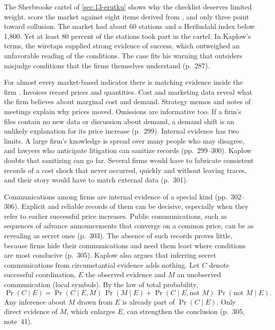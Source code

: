 The Sherbrooke cartel of \cref{sec:13-erutku} shows why the checklist deserves limited weight.
\citet[Table~3]{ErutkuHildebrand2010} score the market against eight items derived from \citet{Stigler1964}, and
only three point toward collusion. The market had about 60 stations and a Herfindahl index below 1,800. Yet at
least 80 percent of the stations took part in the cartel. In Kaplow's terms, the wiretaps supplied strong evidence
of success, which outweighed an unfavorable reading of the conditions. The case fits his warning that outsiders
misjudge conditions that the firms themselves understand (p.~287).

For almost every market-based indicator there is matching evidence inside the firm \citep[pp.~295--302]{Kaplow2013}.
Invoices record prices and quantities. Cost and marketing data reveal what the firm believes about marginal cost
and demand. Strategy memos and notes of meetings explain why prices moved. Omissions are informative too. If a
firm's files contain no new data or discussion about demand, a demand shift is an unlikely explanation for its
price increase (p.~299). Internal evidence has two limits. A large firm's knowledge is spread over many people who
may disagree, and lawyers who anticipate litigation can sanitize records (pp.~299--300). Kaplow doubts that
sanitizing can go far. Several firms would have to fabricate consistent records of a cost shock that never
occurred, quickly and without leaving traces, and their story would have to match external data (p.~301).

Communications among firms are internal evidence of a special kind (pp.~302--306). Explicit and reliable records
of them can be decisive, especially when they refer to earlier successful price increases. Public communications,
such as sequences of advance announcements that converge on a common price, can be as revealing as secret ones
(p.~303). The absence of such records proves little, because firms hide their communications and need them least
where conditions are most conducive (p.~305). Kaplow also argues that inferring secret communications from
circumstantial evidence adds nothing. Let $C$ denote successful coordination, $E$ the observed evidence and $M$ an
unobserved communication (local symbols). By the law of total probability,
\begin{equation*}
  \Pr(C \mid E) = \Pr(C \mid E, M)\,\Pr(M \mid E) + \Pr(C \mid E, \text{not } M)\,\Pr(\text{not } M \mid E) .
\end{equation*}
Any inference about $M$ drawn from $E$ is already part of $\Pr(C \mid E)$. Only direct evidence of $M$, which
enlarges $E$, can strengthen the conclusion (p.~305, note~41).

